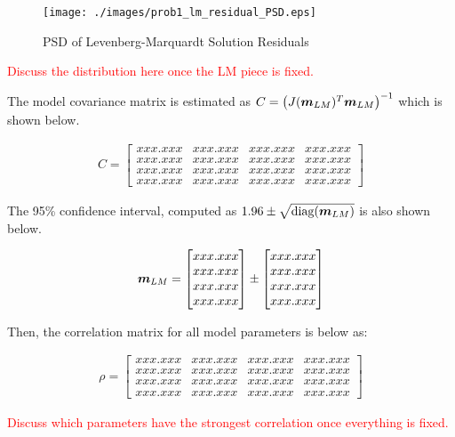  \begin{figure}[h] 
 	\centering
 	\texttt{[image: ./images/prob1\_lm\_residual\_PSD.eps]}
 	\caption{PSD of Levenberg-Marquardt Solution Residuals}
 	\label{fig: prob1 lm solution residuals PSD}
 \end{figure}
 \FloatBarrier

\textcolor{red}{Discuss the distribution here once the LM piece is fixed.}

The model covariance matrix is estimated as $C = \left(J(\boldsymbol{m}_{LM})^T \boldsymbol{m}_{LM}\right)^{-1}$ which is shown below. 

\begin{align*}
	C = \begin{bmatrix}
		xxx.xxx & xxx.xxx & xxx.xxx & xxx.xxx \\
		xxx.xxx & xxx.xxx & xxx.xxx & xxx.xxx \\
		xxx.xxx & xxx.xxx & xxx.xxx & xxx.xxx \\
		xxx.xxx & xxx.xxx & xxx.xxx & xxx.xxx
	\end{bmatrix}
\end{align*}

The 95\% confidence interval, computed as $1.96 \pm \sqrt{\textrm{diag}(\boldsymbol{m}_{LM})}$ is also shown below. 

\begin{align*}
	\boldsymbol{m}_{LM} = \begin{bmatrix} xxx.xxx \\ xxx.xxx \\ xxx.xxx \\ xxx.xxx \end{bmatrix} \pm \begin{bmatrix} xxx.xxx \\ xxx.xxx \\ xxx.xxx \\ xxx.xxx \end{bmatrix}
\end{align*}

Then, the correlation matrix for all model parameters is below as:

\begin{align*}
	\rho = \begin{bmatrix}
		xxx.xxx & xxx.xxx & xxx.xxx & xxx.xxx \\
		xxx.xxx & xxx.xxx & xxx.xxx & xxx.xxx \\
		xxx.xxx & xxx.xxx & xxx.xxx & xxx.xxx \\
		xxx.xxx & xxx.xxx & xxx.xxx & xxx.xxx
	\end{bmatrix}
\end{align*}

\textcolor{red}{Discuss which parameters have the strongest correlation once everything is fixed.}

